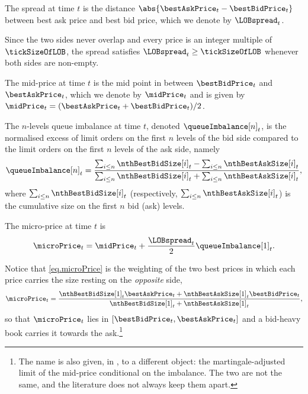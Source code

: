 \begin{defi}
The spread at time $t$ is the distance $\abs{\bestAskPrice_t - \bestBidPrice_t}$
between best ask price and best bid price,
which we denote by $\LOBspread_t$.
\end{defi}
Since the two sides never overlap and every price is an integer multiple of $\tickSizeOfLOB$,
the spread satisfies $\LOBspread_t \geq \tickSizeOfLOB$ whenever both sides are non-empty.
\begin{defi}
The mid-price at time $t$ is the mid point in between $\bestBidPrice_t$ and $\bestAskPrice_{t}$,
which we denote by $\midPrice_t$ and is given by
$\midPrice_t = (\bestAskPrice_t + \bestBidPrice_{t})/{2}$.
\end{defi}
\begin{defi}
The $n$-levels queue imbalance at time $t$,
denoted $\queueImbalance[n]_t$,
is the normalised excess of limit orders on the first $n$ levels of the bid side
compared to the limit orders on the first $n$ levels of the ask side, namely
\begin{equation}
\label{eq.queueImbalance}
\queueImbalance[n]_t =
\frac{\sum_{i\leq n}\nthBestBidSize[i]_t - \sum_{i\leq n}\nthBestAskSize[i]_t}{\sum_{i\leq n}\nthBestBidSize[i]_t + \sum_{i\leq n}\nthBestAskSize[i]_t},
\end{equation}
where $\sum_{i\leq n}\nthBestBidSize[i]_t$
(respectively, $\sum_{i\leq n}\nthBestAskSize[i]_t$)
is the cumulative size on the first $n$ bid (ask) levels.
\end{defi}
\begin{defi}
The micro-price at time $t$ is
\begin{equation}
\label{eq.microPrice}
\microPrice_t
=
\midPrice_t + \frac{\LOBspread_t}{2}\queueImbalance[1]_t .
\end{equation}
\end{defi}
\begin{remark}
Notice that \eqref{eq.microPrice} is the weighting of the two best prices
in which each price carries the size resting on the \emph{opposite} side,
\begin{equation*}
\microPrice_t
=
\frac{\nthBestBidSize[1]_t\bestAskPrice_t + \nthBestAskSize[1]_t\bestBidPrice_t}
{\nthBestBidSize[1]_t + \nthBestAskSize[1]_t} ,
\end{equation*}
so that $\microPrice_t$ lies in $[\bestBidPrice_t, \bestAskPrice_t]$
and a bid-heavy book carries it towards the ask.\footnote{
The name is also given, in \cite{Sto18mic}, to a different object:
the martingale-adjusted limit of the mid-price conditional on the imbalance.
The two are not the same, and the literature does not always keep them apart.}
\end{remark}
